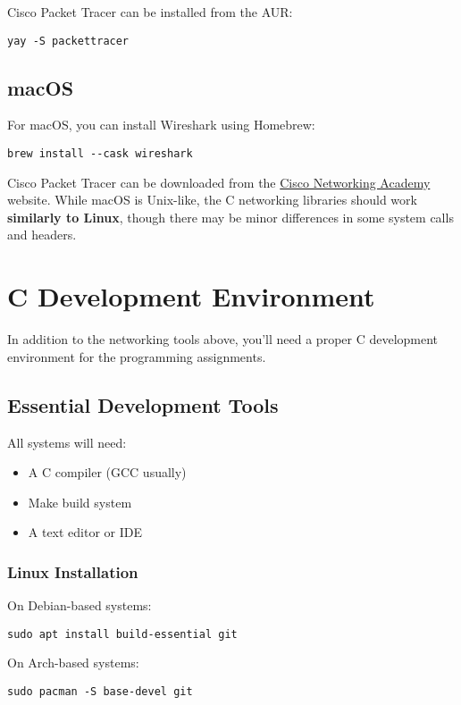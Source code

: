 Cisco Packet Tracer can be installed from the AUR\@:
\begin{verbatim}
yay -S packettracer
\end{verbatim}

\subsection{macOS}
For macOS, you can install Wireshark using Homebrew:
\begin{verbatim}
brew install --cask wireshark
\end{verbatim}

Cisco Packet Tracer can be downloaded from the \href{https://www.netacad.com/courses/packet-tracer}{Cisco Networking Academy} website. While macOS is Unix-like, the C networking libraries should work \textbf{similarly to Linux}, though there may be minor differences in some system calls and headers.

\section{C Development Environment}

In addition to the networking tools above, you'll need a proper C development environment for the programming assignments.

\subsection{Essential Development Tools}

All systems will need:
\begin{itemize}
    \item A C compiler (GCC usually)
    \item Make build system
    \item A text editor or IDE
\end{itemize}

\subsubsection{Linux Installation}

On Debian-based systems:
\begin{verbatim}
sudo apt install build-essential git
\end{verbatim}

On Arch-based systems:
\begin{verbatim}
sudo pacman -S base-devel git
\end{verbatim}

